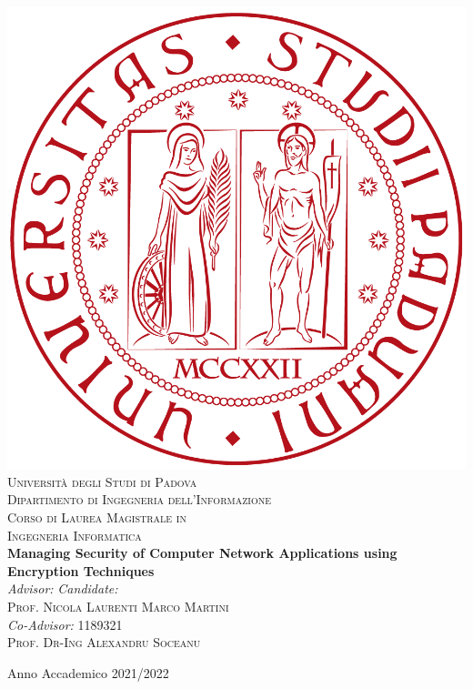 \begin{titlepage}
\begin{center}
\includegraphics[scale=0.1]{images/logo.png}\\

\vspace{0.8cm}
\textsc{\LARGE Universit\`{a} degli Studi di Padova}\\
\vspace{0.45cm}
\textsc{\large Dipartimento di Ingegneria dell'Informazione}\\
\vspace{0.4cm}
\textsc{\large Corso di Laurea Magistrale in}\\
\textsc{\large Ingegneria Informatica}\\
\vfill
{ \LARGE \bfseries Managing Security of Computer Network Applications using Encryption Techniques
}\\
\vfill
\textit{\large Advisor:} \hfill \textit{\large Candidate:}\\
\textsc{\large Prof. Nicola Laurenti} \hfill \textsc{\large Marco Martini}\\
\textit{\large Co-Advisor:} \hfill \textsc{\large 1189321}\\
\textsc{\large Prof. Dr-Ing Alexandru Soceanu} \hfill \textsc{}

\vfill
{\large Anno Accademico 2021/2022}
\end{center}
\end{titlepage}

